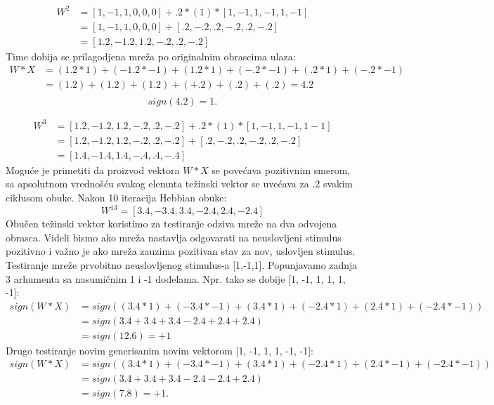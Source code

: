 \documentclass[fontsize=11bp, paper=a4]{scrarticle}
\begin{document}
$$
\begin{aligned}
    W^2 &= [1, -1, 1, 0, 0, 0] + .2 * (1) * [1, -1, 1, -1, 1, -1] \\
     &= [1, -1, 1, 0, 0, 0] + [.2, -.2, .2, -.2, .2, -.2] \\
     &= [1.2, -1.2, 1.2, -.2, .2, -.2]
\end{aligned}
$$
Time dobija se prilagodjena mreža po originalnim obrascima ulaza:
$$ 
\begin{aligned}
    W * X &= (1.2 * 1) + (-1.2 * -1) + (1.2 * 1) + (-.2 * -1) + (.2 * 1) + (-.2 * -1) \\
    &= (1.2) + (1.2) + (1.2) + (+.2) + (.2) + (.2) = 4.2 \\
\end{aligned}
$$
$$
sign(4.2) = 1.
$$

$$
\begin{aligned}
    W^3 &= [1.2, -1.2, 1.2, -.2, .2, -.2] + .2 * (1) * [1, -1, 1, -1, 1 -1] \\
    &= [1.2, -1.2, 1.2, -.2, .2, -.2] + [.2, -.2, .2, -.2, .2, -.2] \\
    &= [1.4, -1.4, 1.4, -.4, .4, -.4]
\end{aligned}
$$
Moguće je primetiti da proizvod vektora $W*X$ se povećava pozitivnim smerom, sa apsolutnom vrednošću svakog elemnta težinski vektor se uvećava za .2 svakim ciklusom obuke. Nakon 10 iteracija Hebbian obuke:
$$
W^{13} = [3.4, -3.4, 3.4, -2.4, 2.4, -2.4]
$$
Obučen težinski vektor koristimo za testiranje odziva mreže na dva odvojena obrasca. Videli bismo ako mreža nastavlja odgovarati na neuslovljeni stimulus pozitivno i važno je ako mreža zauzima pozitivan stav za nov, uslovljen stimulus. Testiranje mreže prvobitno neuslovljenog stimulus-a [1,-1,1]. Popunjavamo zadnja 3 arhumenta sa nasumičnim 1 i -1 dodelama. Npr. tako se dobije [1, -1, 1, 1, 1, -1]:
$$
\begin{aligned}
    sign(W*X) &= sign((3.4*1) + (-3.4*-1) + (3.4*1) + (-2.4*1) + (2.4*1) + (-2.4*-1))\\
    &= sign(3.4 + 3.4 + 3.4 - 2.4 + 2.4 + 2.4)\\
    &= sign(12.6) = +1
\end{aligned}
$$
Drugo testiranje novim generisanim novim vektorom [1, -1, 1, 1, -1, -1]:
$$
\begin{aligned}
    sign(W*X) &= sign((3.4*1) + (-3.4*-1) + (3.4*1) + (-2.4*1) + (2.4*-1) + (-2.4*-1))\\
    &= sign(3.4 + 3.4 + 3.4 - 2.4 - 2.4 + 2.4)\\
    &= sign(7.8) = +1.
\end{aligned}
$$
\end{document}
